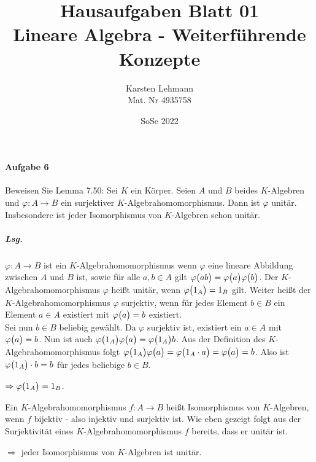 \documentclass{scrreprt}
\author{Karsten Lehmann\\Mat. Nr 4935758}
\date{SoSe 2022}
\title{Hausaufgaben Blatt 01\\Lineare Algebra - Weiterführende Konzepte}
\begin{document}
\paragraph{Aufgabe 6} Beweisen Sie Lemma 7.50: Sei $K$ ein Körper.
Seien $A$ und $B$ beides $K$-Algebren und $\varphi \colon A \to B$ ein
surjektiver $K$-Algebrahomomorphismus.
Dann ist $\varphi$ unitär.
Insbesondere ist jeder Isomorphismus von $K$-Algebren schon unitär.

\subparagraph{Lsg.} $\varphi \colon A \to B$ ist ein $K$-Algebrahomomorphismus
wenn $\varphi$ eine lineare Abbildung zwischen $A$ und $B$ ist, sowie für alle
$a, b \in A$ gilt $\varphi\qty\big(ab) = \varphi\qty\big(a)\varphi\qty\big(b)$.
Der $K$-Algebrahomomorphismus $\varphi$ heißt unitär, wenn
$\varphi\qty\big(1_A) = 1_B$ gilt.
Weiter heißt der $K$-Algebrahomomorphismus $\varphi$ surjektiv, wenn für jedes
Element $b \in B$ ein Element $a \in A$ existiert mit
$\varphi\qty\big(a) = b$ existiert. \\

Sei nun $b \in B$ beliebig gewählt.
Da $\varphi$ surjektiv ist, existiert ein $a \in A$ mit
$\varphi\qty\big(a) = b$.
Nun ist auch $\varphi\qty\big(1_A)\varphi\qty\big(a) = \varphi\qty\big(1_A)b$.
Aus der Definition des $K$-Algebrahomomorphismus folgt
$\varphi\qty\big(1_A)\varphi\qty\big(a) = \varphi\qty\big(1_A \cdot a)
= \varphi\qty\big(a) = b$.
Also ist $\varphi\qty\big(1_A) \cdot b = b$ für jedes beliebige $b \in B$.

$\Rightarrow \varphi\qty\big(1_A) = 1_B$.

Ein $K$-Algebrahomomorphismus $f \colon A \to B$ heißt Isomorphismus
von $K$-Algebren, wenn $f$ bijektiv - also injektiv und surjektiv ist.
Wie eben gezeigt folgt aus der Surjektivität eines $K$-Algebrahomomorphismus
$f$ bereits, dass er unitär ist.

$\Rightarrow$ jeder Isomorphismus von $K$-Algebren ist unitär.
\end{document}
